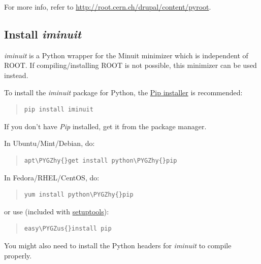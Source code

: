 \documentclass[a4paper,10pt,english]{sphinxmanual}
\def\PYGZus{\char`\_}
\def\PYGZhy{\char`\-}
\begin{document}
For more info, refer to \href{http://root.cern.ch/drupal/content/pyroot}{http://root.cern.ch/drupal/content/pyroot}.


\subsection{Install \emph{iminuit}}
\label{installation:install-iminuit}
\emph{iminuit} is a Python wrapper for the Minuit minimizer which is
independent of ROOT. If compiling/installing ROOT is not possible,
this minimizer can be used instead.

To install the \emph{iminuit} package for Python, the \href{http://www.pip-installer.org/}{Pip installer} is recommended:
\begin{quote}

\begin{Verbatim}[commandchars=\\\{\}]
pip install iminuit
\end{Verbatim}
\end{quote}

If you don't have \emph{Pip} installed, get it from the package manager.

In Ubuntu/Mint/Debian, do:
\begin{quote}

\begin{Verbatim}[commandchars=\\\{\}]
apt\PYGZhy{}get install python\PYGZhy{}pip
\end{Verbatim}
\end{quote}

In Fedora/RHEL/CentOS, do:
\begin{quote}

\begin{Verbatim}[commandchars=\\\{\}]
yum install python\PYGZhy{}pip
\end{Verbatim}
\end{quote}

or use  (included with \href{https://pypi.python.org/pypi/setuptools}{setuptools}):
\begin{quote}

\begin{Verbatim}[commandchars=\\\{\}]
easy\PYGZus{}install pip
\end{Verbatim}
\end{quote}

You might also need to install the Python headers for \emph{iminuit} to
compile properly.
\end{document}
